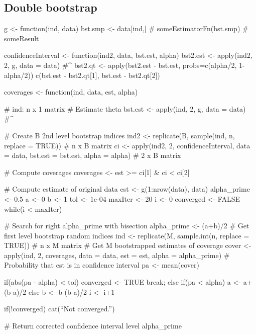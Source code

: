  \subsection{Double bootstrap}
 \begin{code}
  g <- function(ind, data){
    bst.smp <- data[ind,]
    # someEstimatorFn(bst.smp)
    # someResult
  }
 
  confidenceInterval <- function(ind2, data, bst.est, alpha){
    bst2.est <- apply(ind2, 2, g, data = data) #\hat{\theta}^{\ast\ast}
    bst2.qt <- apply(bst2.est - bst.est, probs=c(alpha/2, 1-alpha/2))
    c(bst.est - bst2.qt[1], bst.est - bst2.qt[2])
  }
 
  coverages <- function(ind, data, est, alpha){ # ind: n x 1 matrix
    # Estimate theta
    bst.est <- apply(ind, 2, g, data = data) #\hat{\theta}^{\ast}
    
    # Create B 2nd level bootstrap indices
    ind2 <- replicate(B, sample(ind, n, replace = TRUE)) # n x B matrix
    ci <- apply(ind2, 2, confidenceInterval, data = data, bst.est = bst.est, alpha = alpha) # 2 x B matrix
    
    # Compute coverages
    coverages <- est >= ci[1] & ci < ci[2]
  }
 
  # Compute estimate of original data
  est <- g(1:nrow(data), data)
  alpha_prime <- 0.5
  a <- 0
  b <- 1
  tol <- 1e-04
  maxIter <- 20
  i <- 0
  converged <- FALSE
  while(i < maxIter){ # Search for right alpha_prime with bisection
    alpha_prime <- (a+b)/2
    # Get first level bootstrap random indices
    ind <- replicate(M, sample.int(n, replace = TRUE)) # n x M matrix
    # Get M bootstrapped estimates of coverage
    cover <- apply(ind, 2, coverages, data = data, est = est, alpha = alpha_prime)
    # Probability that est is in confidence interval
    pa <- mean(cover)
    
    if(abs(pa - alpha) < tol){
        converged <- TRUE
        break;
    }
    else{
        if(pa < alpha){
            a <- a+(b-a)/2
        }
        else{
            b <- b-(b-a)/2
        }
    }
    i <- i+1
  }
  
  if(!converged){
    cat(``Not converged.'')
  }
  
  # Return corrected confidence interval level
  alpha_prime
 \end{code}

